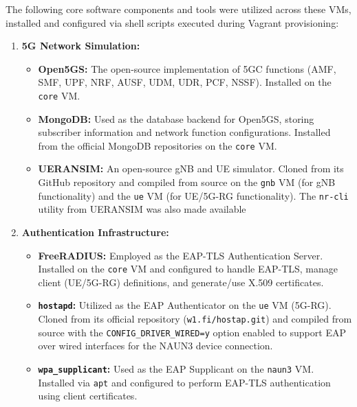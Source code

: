 The following core software components and tools were utilized across these \acp{VM}, installed and configured via shell scripts executed during Vagrant provisioning:

\begin{enumerate}
    \item  {
        \textbf{\ac{5G} Network Simulation:}
        \begin{itemize}
            \item \textbf{Open5GS:} The open-source implementation of \ac{5GC} functions (\ac{AMF}, \ac{SMF}, \ac{UPF}, \ac{NRF}, \ac{AUSF}, \ac{UDM}, \ac{UDR}, \ac{PCF}, \ac{NSSF}). Installed on the \texttt{core} \ac{VM}.

            \item \textbf{MongoDB:} Used as the database backend for Open5GS, storing subscriber information and network function configurations. Installed from the official MongoDB repositories on the \texttt{core} \ac{VM}.

            \item \textbf{UERANSIM:} An open-source \ac{gNB} and \ac{UE} simulator. Cloned from its GitHub repository and compiled from source on the \texttt{gnb} \ac{VM} (for \ac{gNB} functionality) and the \texttt{ue} \ac{VM} (for \ac{UE}/\ac{5G-RG} functionality). The \texttt{nr-cli} utility from UERANSIM was also made available
        \end{itemize}
    }

    \item {
        \textbf{Authentication Infrastructure:}
        \begin{itemize}
            \item \textbf{FreeRADIUS:} Employed as the \ac{EAP-TLS} Authentication Server. Installed on the \texttt{core} \ac{VM} and configured to handle \ac{EAP-TLS}, manage client (\ac{UE}/\ac{5G-RG}) definitions, and generate/use X.509 certificates.

            \item \textbf{\texttt{hostapd}:} Utilized as the \ac{EAP} Authenticator on the \texttt{ue} \ac{VM} (\ac{5G-RG}). Cloned from its official repository (\texttt{w1.fi/hostap.git}) and compiled from source with the \texttt{CONFIG\_DRIVER\_WIRED=y} option enabled to support \ac{EAP} over wired interfaces for the \ac{NAUN3} device connection.

            \item \textbf{\texttt{wpa\_supplicant}:} Used as the \ac{EAP} Supplicant on the \texttt{naun3} \ac{VM}. Installed via \texttt{apt} and configured to perform \ac{EAP-TLS} authentication using client certificates.
        \end{itemize}
    }


\end{enumerate}
